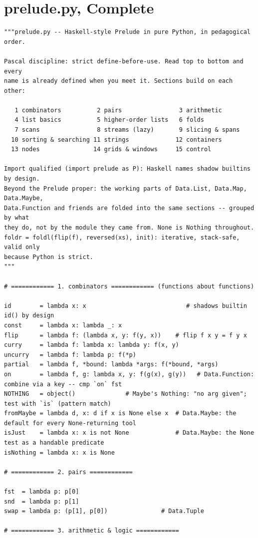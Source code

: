 \documentclass[10pt,letterpaper]{book}
\begin{document}
\chapter{prelude.py, Complete}
\begin{lstlisting}[style=file]
"""prelude.py -- Haskell-style Prelude in pure Python, in pedagogical order.

Pascal discipline: strict define-before-use. Read top to bottom and every
name is already defined when you meet it. Sections build on each other:

   1 combinators          2 pairs                3 arithmetic
   4 list basics          5 higher-order lists   6 folds
   7 scans                8 streams (lazy)       9 slicing & spans
  10 sorting & searching 11 strings             12 containers
  13 nodes               14 grids & windows     15 control

Import qualified (import prelude as P): Haskell names shadow builtins by design.
Beyond the Prelude proper: the working parts of Data.List, Data.Map, Data.Maybe,
Data.Function and friends are folded into the same sections -- grouped by what
they do, not by the module they came from. None is Nothing throughout.
foldr = foldl(flip(f), reversed(xs), init): iterative, stack-safe, valid only
because Python is strict.
"""

# ============ 1. combinators ============ (functions about functions)

id        = lambda x: x                            # shadows builtin id() by design
const     = lambda x: lambda _: x
flip      = lambda f: (lambda x, y: f(y, x))    # flip f x y = f y x
curry     = lambda f: lambda x: lambda y: f(x, y)
uncurry   = lambda f: lambda p: f(*p)
partial   = lambda f, *bound: lambda *args: f(*bound, *args)
on        = lambda f, g: lambda x, y: f(g(x), g(y))   # Data.Function: combine via a key -- cmp `on` fst
NOTHING   = object()              # Maybe's Nothing: "no arg given"; test with `is` (pattern match)
fromMaybe = lambda d, x: d if x is None else x  # Data.Maybe: the default for every None-returning tool
isJust    = lambda x: x is not None             # Data.Maybe: the None test as a handable predicate
isNothing = lambda x: x is None

# ============ 2. pairs ============

fst  = lambda p: p[0]
snd  = lambda p: p[1]
swap = lambda p: (p[1], p[0])               # Data.Tuple

# ============ 3. arithmetic & logic ============


\end{lstlisting}
\end{document}
